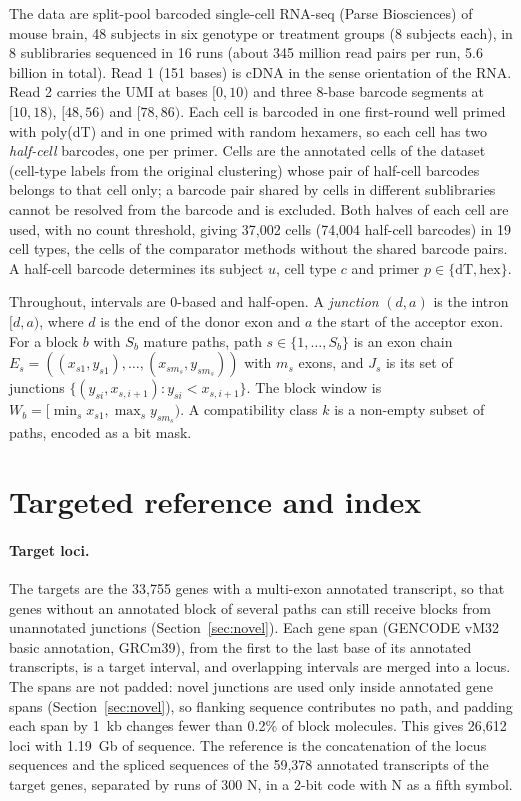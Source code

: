 \documentclass[11pt]{article}
\begin{document}
The data are split-pool barcoded single-cell RNA-seq (Parse Biosciences) of mouse brain, 48 subjects in six genotype or treatment groups (8 subjects each), in 8 sublibraries sequenced in 16 runs (about 345 million read pairs per run, 5.6 billion in total). Read 1 (151 bases) is cDNA in the sense orientation of the RNA. Read 2 carries the UMI at bases $[0,10)$ and three 8-base barcode segments at $[10,18)$, $[48,56)$ and $[78,86)$. Each cell is barcoded in one first-round well primed with poly(dT) and in one primed with random hexamers, so each cell has two \emph{half-cell} barcodes, one per primer. Cells are the annotated cells of the dataset (cell-type labels from the original clustering) whose pair of half-cell barcodes belongs to that cell only; a barcode pair shared by cells in different sublibraries cannot be resolved from the barcode and is excluded. Both halves of each cell are used, with no count threshold, giving 37{,}002 cells (74{,}004 half-cell barcodes) in 19 cell types, the cells of the comparator methods without the shared barcode pairs. A half-cell barcode determines its subject $u$, cell type $c$ and primer $p\in\{\mathrm{dT},\mathrm{hex}\}$.

Throughout, intervals are 0-based and half-open. A \emph{junction} $(d,a)$ is the intron $[d,a)$, where $d$ is the end of the donor exon and $a$ the start of the acceptor exon. For a block $b$ with $S_b$ mature paths, path $s\in\{1,\ldots,S_b\}$ is an exon chain $E_s=((x_{s1},y_{s1}),\ldots,(x_{sm_s},y_{sm_s}))$ with $m_s$ exons, and $J_s$ is its set of junctions $\{(y_{si},x_{s,i+1}):y_{si}<x_{s,i+1}\}$. The block window is $W_b=[\min_s x_{s1},\max_s y_{sm_s})$. A compatibility class $k$ is a non-empty subset of paths, encoded as a bit mask.

\section{Targeted reference and index}

\paragraph{Target loci.} The targets are the 33{,}755 genes with a multi-exon annotated transcript, so that genes without an annotated block of several paths can still receive blocks from unannotated junctions (Section~\ref{sec:novel}). Each gene span (GENCODE vM32 basic annotation, GRCm39), from the first to the last base of its annotated transcripts, is a target interval, and overlapping intervals are merged into a locus. The spans are not padded: novel junctions are used only inside annotated gene spans (Section~\ref{sec:novel}), so flanking sequence contributes no path, and padding each span by 1~kb changes fewer than 0.2\% of block molecules. This gives 26{,}612 loci with 1.19~Gb of sequence. The reference is the concatenation of the locus sequences and the spliced sequences of the 59{,}378 annotated transcripts of the target genes, separated by runs of 300 N, in a 2-bit code with N as a fifth symbol.
\end{document}
